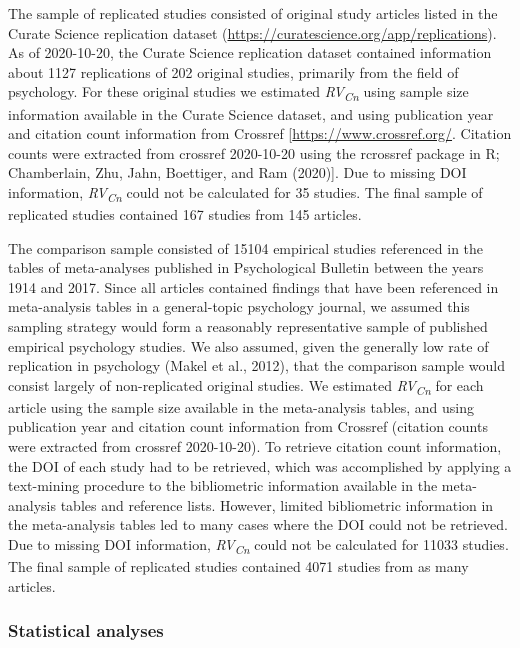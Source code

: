 \documentclass[
  english,
  jou,floatsintext]{apa6}
\begin{document}
The sample of replicated studies consisted of original study articles listed in the Curate Science replication dataset (\url{https://curatescience.org/app/replications}). As of 2020-10-20, the Curate Science replication dataset contained information about 1127 replications of 202 original studies, primarily from the field of psychology. For these original studies we estimated \emph{RV\textsubscript{Cn}} using sample size information available in the Curate Science dataset, and using publication year and citation count information from Crossref {[}\url{https://www.crossref.org/}. Citation counts were extracted from crossref 2020-10-20 using the rcrossref package in R; Chamberlain, Zhu, Jahn, Boettiger, and Ram (2020){]}. Due to missing DOI information, \emph{RV\textsubscript{Cn}} could not be calculated for 35 studies. The final sample of replicated studies contained 167 studies from 145 articles.

The comparison sample consisted of 15104 empirical studies referenced in the tables of meta-analyses published in Psychological Bulletin between the years 1914 and 2017. Since all articles contained findings that have been referenced in meta-analysis tables in a general-topic psychology journal, we assumed this sampling strategy would form a reasonably representative sample of published empirical psychology studies. We also assumed, given the generally low rate of replication in psychology (Makel et al., 2012), that the comparison sample would consist largely of non-replicated original studies. We estimated \emph{RV\textsubscript{Cn}} for each article using the sample size available in the meta-analysis tables, and using publication year and citation count information from Crossref (citation counts were extracted from crossref 2020-10-20). To retrieve citation count information, the DOI of each study had to be retrieved, which was accomplished by applying a text-mining procedure to the bibliometric information available in the meta-analysis tables and reference lists. However, limited bibliometric information in the meta-analysis tables led to many cases where the DOI could not be retrieved. Due to missing DOI information, \emph{RV\textsubscript{Cn}} could not be calculated for 11033 studies. The final sample of replicated studies contained 4071 studies from as many articles.\\

\hypertarget{statistical-analyses}{%
\subsubsection{Statistical analyses}\label{statistical-analyses}}
\end{document}
